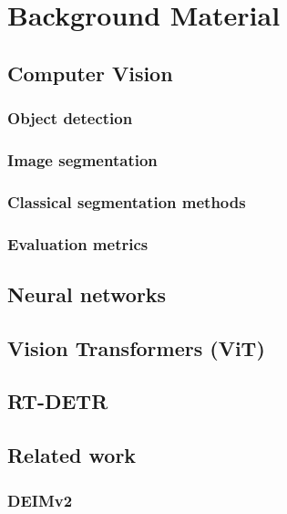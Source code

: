 
\chapter{Background Material}

\section{Computer Vision}

\subsection{Object detection}

\subsection{Image segmentation}

\subsection{Classical segmentation methods}

\subsection{Evaluation metrics}

\section{Neural networks}

\section{Vision Transformers (ViT)}

\section{RT-DETR}

\section{Related work}

\subsection{DEIMv2}

